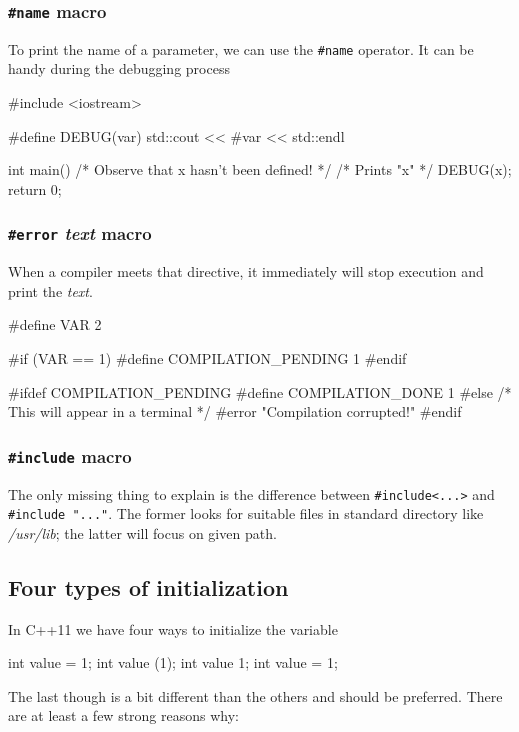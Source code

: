 \documentclass[../main]{subfiles}
\begin{document}
\subsubsection{\texttt{\#name} macro}
    To print the name of a parameter, we can use the \texttt{\#name} operator. It can be handy during the debugging process
\begin{Code}
    #include <iostream>
    
    #define DEBUG(var) std::cout << #var << std::endl
    
    int main()
    {
        /* Observe that x hasn't been defined! */
        /* Prints "x" */
        DEBUG(x);
        return 0;
    }
\end{Code}

\subsubsection{\texttt{\#error} \textit{text} macro}
    When a compiler meets that directive, it immediately will stop execution and print the \textit{text}.
\begin{Code}
    #define VAR 2
    
    #if (VAR == 1)
        #define COMPILATION_PENDING 1
    #endif
    
    #ifdef COMPILATION_PENDING
        #define COMPILATION_DONE 1
    #else
        /* This will appear in a terminal */
        #error "Compilation corrupted!"
    #endif
\end{Code}

\subsubsection{\texttt{\#include} macro}
    The only missing thing to explain is the difference between \texttt{\#include<...>} and \texttt{\#include "..."}. The former looks for suitable files
in standard directory like \textit{/usr/lib}; the latter will focus on given path.

\subsection{Four types of initialization}
    In C++11 we have four ways to initialize the variable
\begin{Code}
    int value = 1;
    int value (1);
    int value {1};
    int value = {1};
\end{Code}

The last though is a bit different than the others and should be preferred. There are at least a few strong reasons why:
\end{document}
